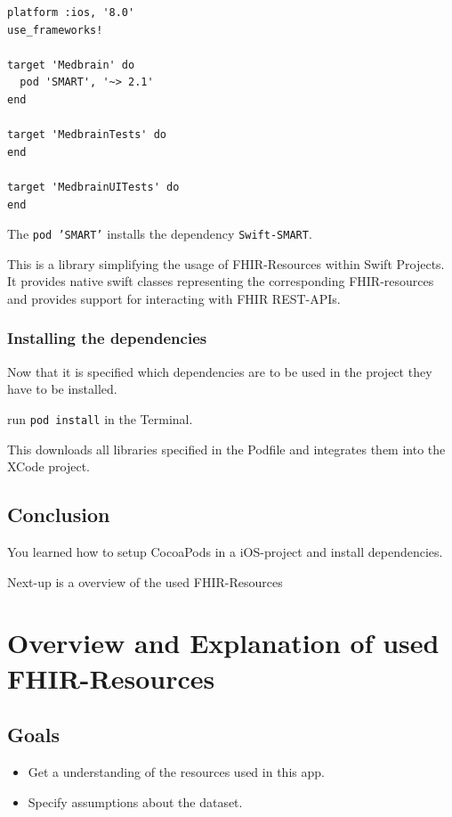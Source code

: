 \documentclass{article}
\begin{document}
\begin{verbatim}
platform :ios, '8.0'
use_frameworks!

target 'Medbrain' do
  pod 'SMART', '~> 2.1'
end

target 'MedbrainTests' do
end

target 'MedbrainUITests' do
end
\end{verbatim}

The \texttt{pod\ 'SMART'} installs the dependency \texttt{Swift-SMART}\citep{10-swift-smart}.

This is a library simplifying the usage of FHIR-Resources within Swift
Projects.
\\
It provides native swift classes representing the corresponding FHIR-resources and provides support for interacting with FHIR REST-APIs.

\subsubsection{Installing the dependencies}
Now that it is specified which dependencies are to be used in the project they have to be installed.

run \texttt{pod\ install} in the Terminal.

This downloads all libraries specified in the Podfile and integrates
them into the XCode project.

\subsection{Conclusion}\label{step2:conclusion}

You learned how to setup CocoaPods in a iOS-project and install
dependencies.

Next-up is a overview of the used FHIR-Resources

\section{Overview and Explanation of used
FHIR-Resources}\label{step3:overview}

\subsection{Goals}\label{step3:goals}

\begin{itemize}

\item
  Get a understanding of the resources used in this app.
\item
  Specify assumptions about the dataset.
\end{itemize}
\end{document}
